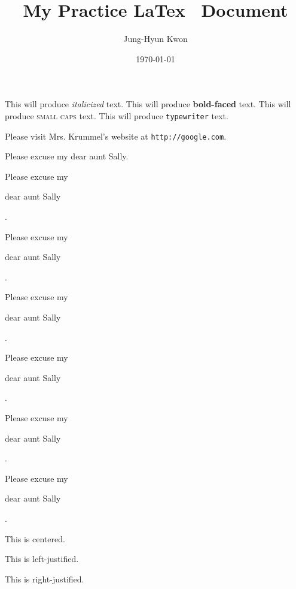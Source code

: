 \documentclass[11pt]{article}
\begin{document}
\tableofcontents 
 
 
  \title{My Practice LaTex \  Document}
  \author{Jung-Hyun Kwon}
  \date{\today} 
  \maketitle

This will produce \textit{italicized} text.
This will produce \textbf{bold-faced} text.
This will produce \textsc{small caps} text.
This will produce \texttt{typewriter} text.

Please visit Mrs. Krummel's website at \texttt{http://google.com}.
 
Please excuse my dear aunt Sally.

Please excuse my \begin{large}dear aunt Sally\end{large}.

Please excuse my \begin{Large}dear aunt Sally\end{Large}.

Please excuse my \begin{huge}dear aunt Sally\end{huge}.

Please excuse my \begin{Huge}dear aunt Sally\end{Huge}.
 
Please excuse my \begin{small}dear aunt Sally\end{small}.

Please excuse my \begin{tiny}dear aunt Sally\end{tiny}.

\begin{center} This is centered. \end{center}

\begin{flushleft}
This is left-justified.
\end{flushleft} 

\begin{flushright}
This is right-justified.
\end{flushright}
 
\end{document}
